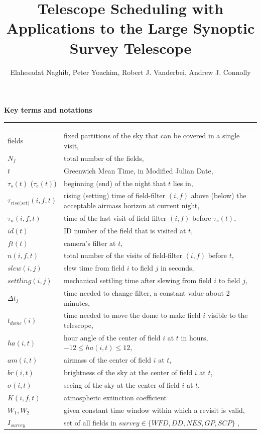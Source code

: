 \documentclass[12pt,aas_macros]{article}
\theoremstyle{definition}
\begin{document}
\title{Telescope Scheduling with Applications to the Large Synoptic Survey Telescope}
\author{Elahesadat Naghib, Peter Yoachim, Robert J. Vanderbei, Andrew J. Connolly}

\maketitle

\begin{center}
\textbf{Key terms and notations}\
\noindent\rule{\textwidth}{0.4pt}
\end{center}

\begin{table}[h]
\begin{tabularx}{\textwidth}{l  X }
fields & fixed partitions of the sky that can be covered in a single visit, \\
$N_{f}$ & total number of the fields,\\
$t$& Greenwich Mean Time, in Modified Julian Date,\\ 
$\tau_s(t)$ ($\tau_e(t)$)& beginning (end) of the night that $t$ lies in,\\
$\tau_{rise\text{(}set\text{)}}(i,f,t)$ & rising (setting) time of field-filter $(i,f)$ above (below) the acceptable airmass horizon at current night,\\
$\tau_n(i,f,t)$& time of the last visit of field-filter $(i,f)$ before $\tau_s(t)$,\\
$id(t)$ & ID number of the field that is visited at $t$,\\
$ft(t)$& camera's filter at $t$,\\
$n(i,f,t)$ & total number of the visits of field-filter $(i,f)$ before $t$,\\
$slew(i,j)$& slew time from field $i$ to field $j$ in seconds,\\
$settling(i,j)$& mechanical settling time after slewing from field $i$ to field $j$,\\
$\Delta t_{f}$& time needed to change filter, a constant value about 2 minutes,\\
$t_{dome}(i)$& time needed to move the dome to make field $i$ visible to the telescope,\\
$ha(i,t)$ & hour angle of the center of field $i$ at $t$ in hours, $-12 \leq ha(i,t) \leq 12$,\\
$am(i,t)$ & airmass of the center of field $i$ at $t$,\\
$br(i,t)$ & brightness of the sky at the center of field $i$ at $t$,\\
$\sigma(i,t)$ & seeing of the sky at the center of field $i$ at $t$,\\
$K(i,f, t)$ & atmospheric extinction coefficient\\
$W_1, W_2$ & given constant time window within which a revisit is valid, \\
$I_{survey}$ & set of all fields in $survey \in \{WFD,DD,NES,GP,SCP\}$ ,\\
\end{tabularx}
\end{table}
\end{document}
